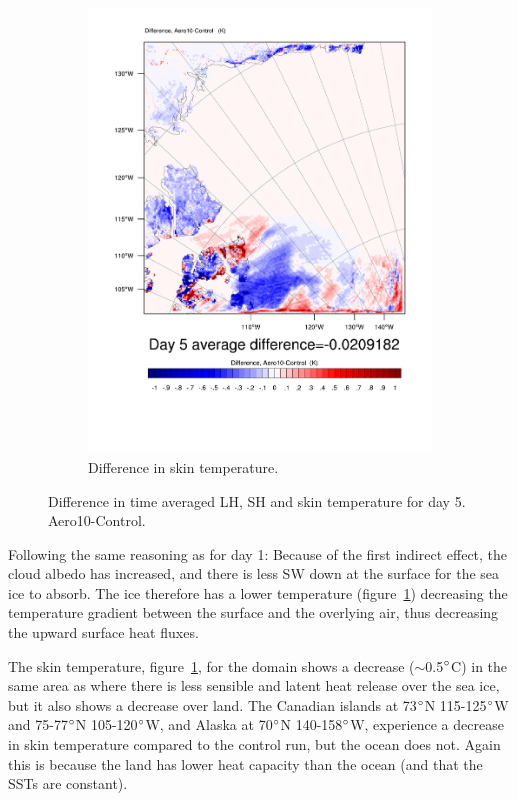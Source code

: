 \begin{figure}
	\begin{subfigure}{0.48\textwidth}
		\includegraphics[width=\textwidth]{results/aero10/diff_Aero10_TSK_Day5.pdf}
		\caption{Difference in skin temperature.}
		\label{subfig:skin_r3Day5}
	\end{subfigure}
	\caption{Difference in time averaged LH, SH and skin temperature for day 5. Aero10-Control.}
	\label{fig:lhshskin_r3Day5}
\end{figure}

Following the same reasoning as for day 1: Because of the first indirect effect, the cloud albedo has increased, and there is less SW down at the surface for the sea ice to absorb. The ice therefore has a lower temperature (figure~\ref{subfig:skin_r3Day5}) decreasing the temperature gradient between the surface and the overlying air, thus decreasing the upward surface heat fluxes.

The skin temperature, figure~\ref{subfig:skin_r3Day5}, for the domain shows a decrease ($\sim$0.5$\degree$C) in the same area as where there is less sensible and latent heat release over the sea ice, but it also shows a decrease over land. The Canadian islands at 73$\degree$N 115-125$\degree$W and 75-77$\degree$N 105-120$\degree$W, and Alaska  at 70$\degree$N 140-158$\degree$W, experience a decrease in skin temperature compared to the control run, but the ocean does not. Again this is because the land has lower heat capacity than the ocean (and that the SSTs are constant).

